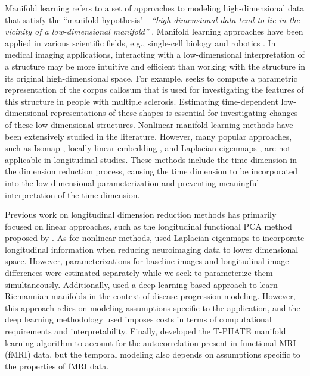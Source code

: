 \documentclass[12pt]{article}
\theoremstyle{definition}
\begin{document}
Manifold learning refers to a set of approaches to modeling high-dimensional data that satisfy the ``manifold hypothesis"---\textit{``high-dimensional data tend to lie in the vicinity of a low-dimensional manifold''} \citep{fefferman2016testing}. Manifold learning approaches have been applied in various scientific fields, e.g., single-cell biology \citep{ding2023learning} and robotics \citep{gao2023k}. In medical imaging applications, interacting with a low-dimensional interpretation of a structure may be more intuitive and efficient than working with the structure in its original high-dimensional space. For example, \cite{yueParameterizationWhiteMatter2016} seeks to compute a parametric representation of the corpus callosum that is used for investigating the features of this structure in people with multiple sclerosis. Estimating time-dependent low-dimensional representations of these shapes is essential for investigating changes of these low-dimensional structures. Nonlinear manifold learning methods have been extensively studied in the literature. However, many popular approaches, such as Isomap \citep{tenenbaumGlobalGeometricFramework2000}, locally linear embedding \citep{roweisNonlinearDimensionalityReduction2000}, and Laplacian eigenmaps \citep{belkin2003laplacian}, are not applicable in longitudinal studies. These methods include the time dimension in the dimension reduction process, causing the time dimension to be incorporated into the low-dimensional parameterization and preventing meaningful interpretation of the time dimension. %

Previous work on longitudinal dimension reduction methods has primarily focused on linear approaches, such as the longitudinal functional PCA method proposed by \cite{greven2011longitudinal}. As for nonlinear methods, \cite{wolzManifoldLearningBiomarker2010} used Laplacian eigenmaps to incorporate longitudinal information when reducing neuroimaging data to lower dimensional space. However, parameterizations for baseline images and longitudinal image differences were estimated separately while we seek to parameterize them simultaneously. Additionally, \cite{louisRiemannianGeometryLearning2019} used a deep learning-based approach to learn Riemannian manifolds in the context of disease progression modeling. However, this approach relies on modeling assumptions specific to the application, and the deep learning methodology used imposes costs in terms of computational requirements and interpretability. Finally, \cite{busch2023Multiview} developed the T-PHATE manifold learning algorithm to account for the autocorrelation present in functional MRI (fMRI) data, but the temporal modeling also depends on assumptions specific to the properties of fMRI data.
\end{document}
